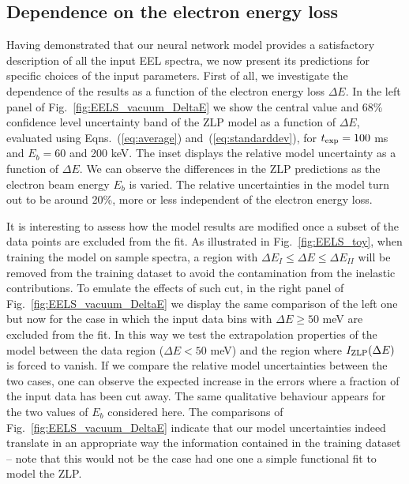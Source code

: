 \subsection{Dependence on the electron energy loss}
\label{eq:depdeltae}

Having demonstrated that our neural network model provides a satisfactory description
of all the input EEL spectra, we now present its  predictions for specific
choices of the input parameters.
%
First of all, we investigate the dependence of the results as a function of the
electron energy loss $\Delta E$.
%
In the left panel of Fig.~\ref{fig:EELS_vacuum_DeltaE} we show the central value and 68\% confidence level uncertainty band of the ZLP model as a function
of $\Delta E$,
evaluated using Eqns.~(\ref{eq:average}) and~(\ref{eq:standarddev}), for $t_{\rm exp}=100$ ms
and $E_{b}=60$ and 200 keV.
%
The inset displays the relative model uncertainty as a function of $\Delta E$.
%
We can observe the differences in the ZLP predictions as the electron beam energy $E_b$ is varied.
%
The relative uncertainties in the model turn out to be around 20\%, more or less independent
of the electron energy loss.

It is interesting to assess how the model results are modified once a subset of the data points
are excluded from the fit.
%
As illustrated in Fig.~\ref{fig:EELS_toy}, when training the model on sample spectra, a region
with $\Delta E_I \le \Delta E \le \Delta E_{II}$ will be removed from the training dataset to avoid the
contamination from the inelastic contributions.
%
To emulate the effects of such cut, in the right panel of Fig.~\ref{fig:EELS_vacuum_DeltaE} we
display the same comparison of the left one but now
for the case in which the input data bins with $\Delta E \ge 50$ meV are excluded from the fit.
%
In this way we test the extrapolation properties of the model between the data region ($\Delta E < 50$ meV)
and the region where $I_{\rm ZLP}(\Delta E)$ is forced to vanish.
%
If we compare the relative model uncertainties between the two cases, one can observe the expected
increase in the errors where a fraction of the input data has been cut away.
%
The same qualitative behaviour appears for the two values of $E_b$ considered here.
%
The comparisons of Fig.~\ref{fig:EELS_vacuum_DeltaE} indicate that our model uncertainties
indeed translate in an appropriate way the information contained in the training dataset -- note that
this would not be the case had one one a simple functional fit to model the ZLP.

